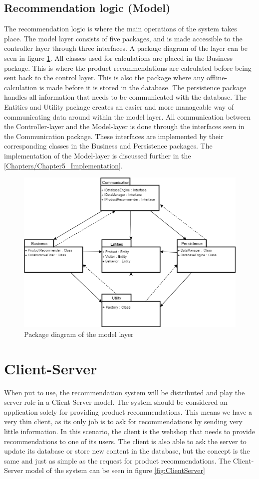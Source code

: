 \subsection{Recommendation logic (Model)}
The recommendation logic is where the main operations of the system takes place. The model layer consists of five packages, and is made accessible to the controller layer through three interfaces. A package diagram of the layer can be seen in figure \ref{fig:PackageDiagram}. All classes used for calculations are placed in the Business package. This is where the product recommendations are calculated before being sent back to the control layer. This is also the package where any offline-calculation is made before it is stored in the database. The persistence package handles all information that needs to be communicated with the database. The Entities and Utility package creates an easier and more manageable way of communicating data around within the model layer. All communication between the Controller-layer and the Model-layer is done through the interfaces seen in the Communication package. These interfaces are implemented by their corresponding classes in the Business and Persistence packages. The implementation of the Model-layer is discussed further in the \ref{Chapters/Chapter5_Implementation}.

\begin{figure}
	\centering
	\includegraphics[width=.8\linewidth]{Figures/PackageDiagram.png}
	\caption{Package diagram of the model layer}
	\label{fig:PackageDiagram}
\end{figure}

\section{Client-Server}
When put to use, the recommendation system will be distributed and play the server role in a Client-Server model. The system should be considered an application solely for providing product recommendations. This means we have a very thin client, as its only job is to ask for recommendations by sending very little information. In this scenario, the client is the webshop that needs to provide recommendations to one of its users. The client is also able to ask the server to update its database or store new content in the database, but the concept is the same and just as simple as the request for product recommendations. The Client-Server model of the system can be seen in figure \ref{fig:ClientServer}

